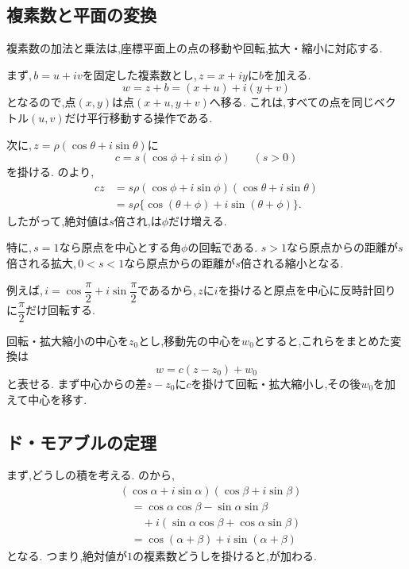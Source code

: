   \subsection{複素数と平面の変換}\label{節：複素数による平面上の変換}

    複素数の加法と乗法は,座標平面上の点の移動や回転,拡大・縮小に対応する.

    まず,\,$b=u+iv$を固定した複素数とし,\,$z=x+iy$に$b$を加える.
    \[
      w=z+b=(x+u)+i(y+v)
    \]
    となるので,点$(x,y)$は点$(x+u,y+v)$へ移る.
    これは,すべての点を同じベクトル$(u,v)$だけ平行移動する操作である.

    次に,\,$z=\rho(\cos\theta+i\sin\theta)$に
    \[
      c=s(\cos\phi+i\sin\phi)
      \qquad(s>0)
    \]
    を掛ける.
    のより,
    \begin{align*}
      cz
        &=s\rho
          (\cos\phi+i\sin\phi)
          (\cos\theta+i\sin\theta)\\
        &=s\rho
          \{\cos(\theta+\phi)+i\sin(\theta+\phi)\}.
    \end{align*}
    したがって,絶対値は$s$倍され,は$\phi$だけ増える.

    特に,\,$s=1$なら原点を中心とする角$\phi$の回転である.
    $s>1$なら原点からの距離が$s$倍される拡大,\,$0<s<1$なら原点からの距離が$s$倍される縮小となる.
  \BookFigComplexRotation

    例えば,\,$i=\cos\dfrac{\pi}{2}+i\sin\dfrac{\pi}{2}$であるから,\,$z$に$i$を掛けると原点を中心に反時計回りに$\dfrac{\pi}{2}$だけ回転する.

    回転・拡大縮小の中心を$z_0$とし,移動先の中心を$w_0$とすると,これらをまとめた変換は
    \[
      w=c(z-z_0)+w_0
    \]
    と表せる.
    まず中心からの差$z-z_0$に$c$を掛けて回転・拡大縮小し,その後$w_0$を加えて中心を移す.

  \subsection{ド・モアブルの定理}\label{節：ド・モアブルの定理}
    まず,どうしの積を考える.
    のから,
    \begin{align*}
      &(\cos\alpha+i\sin\alpha)
       (\cos\beta+i\sin\beta)\\
      &\quad=
       \cos\alpha\cos\beta-\sin\alpha\sin\beta\\
      &\qquad
       +i(\sin\alpha\cos\beta+\cos\alpha\sin\beta)\\
      &\quad=
       \cos(\alpha+\beta)+i\sin(\alpha+\beta)
    \end{align*}
    となる.
    つまり,絶対値が$1$の複素数どうしを掛けると,が加わる.

